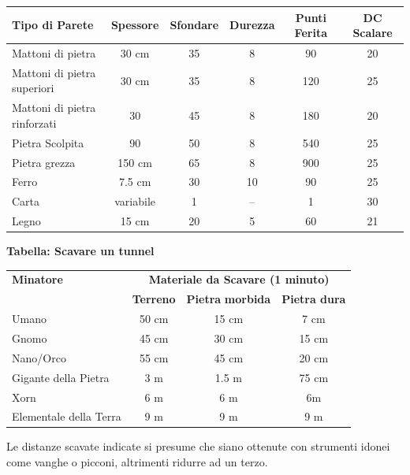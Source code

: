 \noindent\begin{tabularx}{\linewidth}{Xccccc}
	\toprule
\textbf{Tipo di Parete} & \textbf{Spessore} & \textbf{Sfondare} & \textbf{Durezza} & \textbf{Punti Ferita} & \textbf{DC Scalare}\\
\toprule
Mattoni di pietra & 30 cm& 35 & 8 & 90& 20\\
Mattoni di pietra superiori & 30 cm& 35 & 8 & 120 & 25\\
Mattoni di pietra rinforzati & 30 & 45 & 8 & 180 & 20\\
Pietra Scolpita & 90 & 50 & 8 & 540 & 25\\
Pietra grezza & 150 cm & 65 & 8 & 900 & 25\\
Ferro & 7.5 cm & 30 & 10& 90& 25\\
Carta & variabile & 1 & --& 1 & 30\\
Legno & 15 cm& 20 & 5 & 60& 21
\end{tabularx}

\medskip

\textbf{Tabella: Scavare un tunnel}

\medskip

\noindent\begin{tabularx}{\linewidth}{Xccc}
	\toprule
\textbf{Minatore}&\multicolumn{3}{c}{\textbf{Materiale da Scavare (1 minuto)}}\\
&\textbf{Terreno}&\textbf{Pietra} \textbf{morbida}&\textbf{Pietra dura}\\
\toprule
Umano&50 cm&15 cm&7 cm\\
Gnomo &45 cm&30 cm&15 cm\\
Nano/Orco & 55 cm&45 cm&20 cm\\
Gigante della Pietra& 3 m& 1.5 m& 75 cm\\
Xorn &6 m&6 m& 6m\\
Elementale della Terra & 9 m&9 m&9 m
\end{tabularx}

\medskip

Le distanze scavate indicate si presume che siano ottenute con strumenti idonei come vanghe o picconi, altrimenti ridurre ad un terzo.

